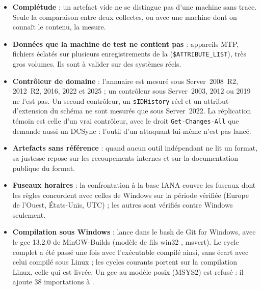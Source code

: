\documentclass[11pt,a4paper,oneside]{report}
\begin{document}
\begin{itemize}
  \item \textbf{Complétude} : un artefact vide ne se distingue pas d'une
    machine sans trace. Seule la comparaison entre deux collectes, ou avec une
    machine dont on connaît le contenu, la mesure.
  \item \textbf{Données que la machine de test ne contient pas} :
    appareils MTP, fichiers éclatés sur plusieurs enregistrements de la
     (\texttt{\$ATTRIBUTE\_LIST}), très gros volumes. Ils sont à
    valider sur des systèmes réels.
  \item \textbf{Contrôleur de domaine} : l'annuaire est mesuré sous
    Server~2008~R2, 2012~R2, 2016, 2022 et 2025 ; un contrôleur sous Server~2003,
    2012 ou 2019 ne l'est pas. Un second contrôleur, un \texttt{sIDHistory} réel
    et un attribut d'extension du schéma ne sont mesurés que sous Server~2022.
    La réplication témoin est celle d'un vrai contrôleur, avec le droit
    \texttt{Get-Changes-All} que demande aussi un DCSync : l'outil d'un
    attaquant lui-même n'est pas lancé.
  \item \textbf{Artefacts sans référence} : quand aucun outil indépendant ne
    lit un format, sa justesse repose sur les recoupements internes et sur la
    documentation publique du format.
  \item \textbf{Fuseaux horaires} : la confrontation à la base IANA couvre les
    fuseaux dont les règles concordent avec celles de Windows sur la période
    vérifiée (Europe de l'Ouest, États-Unis, UTC) ; les autres sont vérifiés
    contre Windows seulement.
  \item \textbf{Compilation sous Windows} :  lance
     dans le bash de Git for Windows, avec le gcc
    13.2.0 de MinGW-Builds (modèle de fils \og win32 \fg{}, msvcrt). Le cycle
    complet a été passé une fois avec l'exécutable compilé ainsi, sans écart
    avec celui compilé sous Linux ; les cycles courants portent sur la
    compilation Linux, celle qui est livrée. Un gcc au modèle \og posix \fg{}
    (MSYS2) est refusé : il ajoute 38 importations à .
\end{itemize}
\end{document}
